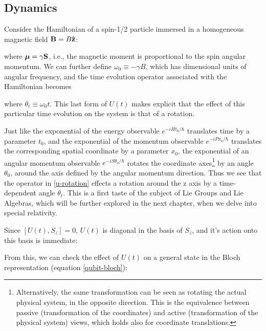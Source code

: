 \documentclass[12pt,a4paper,notitlepage]{report}
\begin{document}
\subsection{Dynamics}

Consider the Hamiltonian of a spin-1/2 particle immersed in a homogeneous magnetic field $\vb{B} = B\vu{z}$:

where $\vb*{\mu} = \gamma \vb{S}$, i.e., the magnetic moment is proportional to the spin angular momentum. We can further define $\omega_0 \equiv -\gamma B$, which has dimensional units of angular frequency, and the time evolution operator associated with the Hamiltonian becomes

%
where $\theta_t \equiv \omega_0 t$. This last form of $U(t)$ makes explicit that the effect of this particular time evolution on the system is that of a rotation.

Just like the exponential of the energy observable $e^{-iHt_0/\hbar}$ translates time by a parameter $t_0$, and the exponential of the momentum observable $e^{-iP x_0/\hbar}$ translates the corresponding spatial coordinate by a parameter $x_0$, the exponential of an angular momentum observable $e^{-iS\theta_0/\hbar}$ rotates the coordinate axes\footnote{Alternatively, the same transformation can be seen as rotating the actual physical system, in the opposite direction. This is the equivalence between passive (transformation of the coordinates) and active (transformation of the physical system) views, which holds also for coordinate translations.} by an angle $\theta_0$, around the axis defined by the angular momentum direction. Thus we see that the operator in \eqref{u-rotation} effects a rotation around the z axis by a time-dependent angle $\theta_t$. This is a first taste of the subject of Lie Groups and Lie Algebras, which will be further explored in the next chapter, when we delve into special relativity.

Since $[U(t), S_z]=0$, $U(t)$ is diagonal in the basis of $S_z$, and it's action onto this basis is immediate:

From this, we can check the effect of $U(t)$ on a general state in the Bloch representation (equation \eqref{qubit-bloch}):
\end{document}
